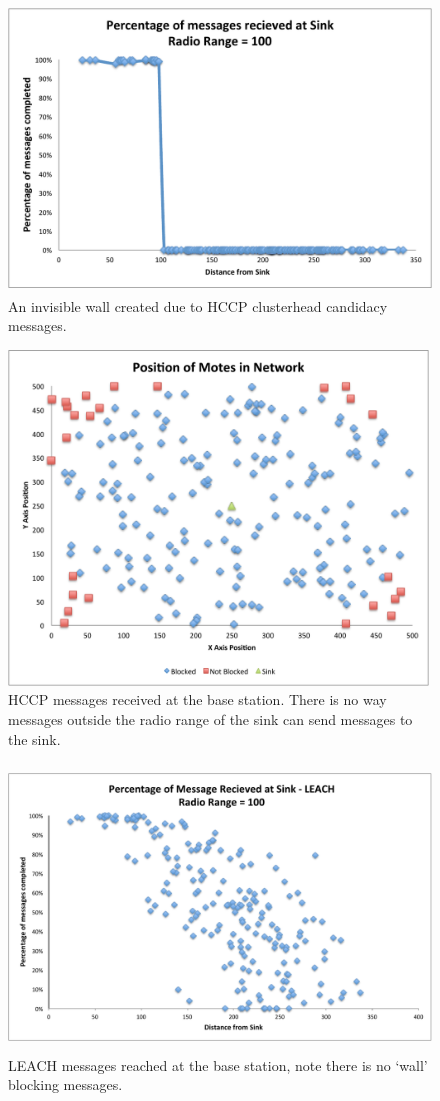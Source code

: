\begin{figure}[htb]
	\centering
		\includegraphics[height=3in]{images/HCCPBlocking/starvation.pdf}
	\caption{An invisible wall created due to HCCP clusterhead candidacy messages.}
	\label{fig:images_HCCPBlocking_hccpblocking}
\end{figure}
\begin{figure}[htb]
	\centering
		\includegraphics[height=3.5in]{images/HCCPBlocking/starvationMap.pdf}
	\caption{HCCP messages received at the base station. There is no way messages outside the radio range of the sink can send messages to the sink.}
	\label{fig:starvationMap}
\end{figure}

\begin{figure}[htb]
	\centering
		\includegraphics[height=3in]{images/HCCPBlocking/StarvationLeach.pdf}
	\caption{LEACH messages reached at the base station, note there is no `wall' blocking messages.}
	\label{fig:StarvationLeach}
\end{figure}

